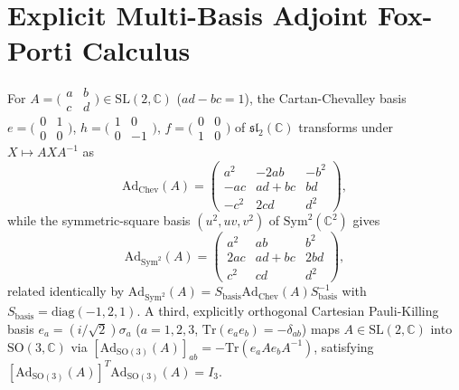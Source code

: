 \documentclass[aps,prd,twocolumn,nofootinbib,floatfix]{revtex4-2}
\begin{document}
\appendix

\section{Explicit Multi-Basis Adjoint Fox-Porti Calculus}
\label{app:porti}

For $A = \bigl(\begin{smallmatrix} a & b \\ c & d \end{smallmatrix}\bigr) \in \mathrm{SL}(2,\mathbb{C})$ ($ad - bc = 1$), the Cartan-Chevalley basis $e = \bigl(\begin{smallmatrix} 0 & 1 \\ 0 & 0 \end{smallmatrix}\bigr)$, $h = \bigl(\begin{smallmatrix} 1 & 0 \\ 0 & -1 \end{smallmatrix}\bigr)$, $f = \bigl(\begin{smallmatrix} 0 & 0 \\ 1 & 0 \end{smallmatrix}\bigr)$ of $\mathfrak{sl}_2(\mathbb{C})$ transforms under $X \mapsto A X A^{-1}$ as
\begin{equation}
\label{eq:ad_chev}
\mathrm{Ad}_{\mathrm{Chev}}(A) =
\begin{pmatrix}
a^2 & -2ab & -b^2 \\
-ac & ad + bc & bd \\
-c^2 & 2cd & d^2
\end{pmatrix},
\end{equation}
while the symmetric-square basis $(u^2, uv, v^2)$ of $\mathrm{Sym}^2(\mathbb{C}^2)$ gives
\begin{equation}
\label{eq:ad_sym2}
\mathrm{Ad}_{\mathrm{Sym}^2}(A) =
\begin{pmatrix}
a^2 & ab & b^2 \\
2ac & ad + bc & 2bd \\
c^2 & cd & d^2
\end{pmatrix},
\end{equation}
related identically by $\mathrm{Ad}_{\mathrm{Sym}^2}(A) = S_{\mathrm{basis}}\mathrm{Ad}_{\mathrm{Chev}}(A)S_{\mathrm{basis}}^{-1}$ with $S_{\mathrm{basis}} = \mathrm{diag}(-1, 2, 1)$.
A third, explicitly orthogonal Cartesian Pauli-Killing basis $e_a = (i/\sqrt{2})\sigma_a$ ($a = 1,2,3$, $\mathrm{Tr}(e_a e_b) = -\delta_{ab}$) maps $A \in \mathrm{SL}(2,\mathbb{C})$ into $\mathrm{SO}(3,\mathbb{C})$ via $[\mathrm{Ad}_{\mathrm{SO}(3)}(A)]_{ab} = -\mathrm{Tr}(e_a A e_b A^{-1})$, satisfying $[\mathrm{Ad}_{\mathrm{SO}(3)}(A)]^T \mathrm{Ad}_{\mathrm{SO}(3)}(A) = I_3$.
\end{document}
